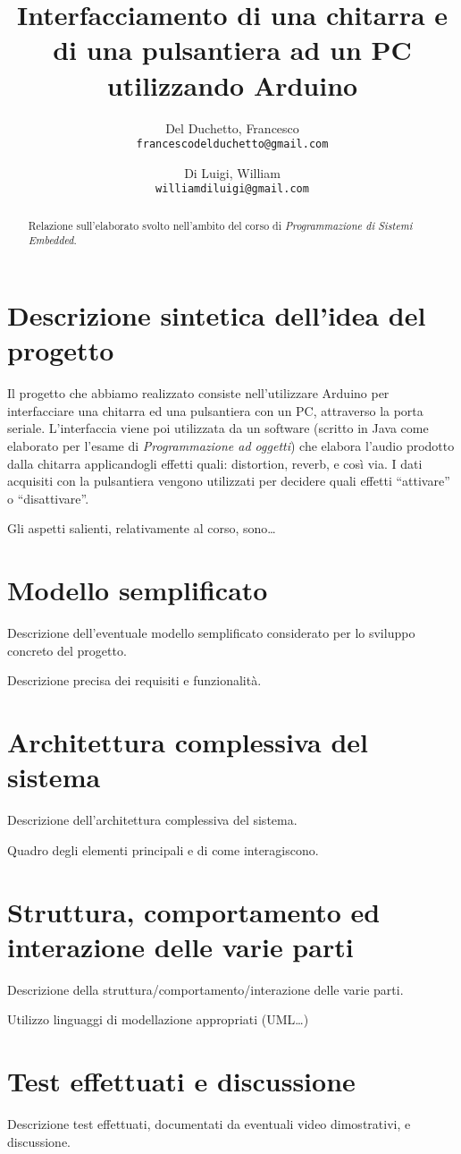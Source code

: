 \documentclass[a4paper,11pt]{article}
\title{Interfacciamento di una chitarra e di una pulsantiera ad un PC utilizzando Arduino}
\author{
	Del Duchetto, Francesco\\
	\texttt{francescodelduchetto@gmail.com}
	\and
	Di Luigi, William\\
	\texttt{williamdiluigi@gmail.com}
}
\begin{document}
\maketitle

\begin{abstract}
	Relazione sull'elaborato svolto nell'ambito del corso di \emph{Programmazione di Sistemi Embedded}.
\end{abstract}

\section{Descrizione sintetica dell'idea del progetto}

Il progetto che abbiamo realizzato consiste nell'utilizzare Arduino per interfacciare una chitarra ed una pulsantiera con un PC, attraverso la porta seriale. L'interfaccia viene poi utilizzata da un software (scritto in Java come elaborato per l'esame di \emph{Programmazione ad oggetti}) che elabora l'audio prodotto dalla chitarra applicandogli effetti quali: distortion, reverb, e così via. I dati acquisiti con la pulsantiera vengono utilizzati per decidere quali effetti ``attivare'' o ``disattivare''.

Gli aspetti salienti, relativamente al corso, sono\dots

\section{Modello semplificato}

Descrizione dell'eventuale modello semplificato considerato per lo sviluppo concreto del progetto.

Descrizione precisa dei requisiti e funzionalità.

\section{Architettura complessiva del sistema}

Descrizione dell'architettura complessiva del sistema.

Quadro degli elementi principali e di come interagiscono.

\section{Struttura, comportamento ed interazione delle varie parti}

Descrizione della struttura/comportamento/interazione delle varie parti.

Utilizzo linguaggi di modellazione appropriati (UML…)

\section{Test effettuati e discussione}

Descrizione test effettuati, documentati da eventuali video dimostrativi, e discussione.
\end{document}
